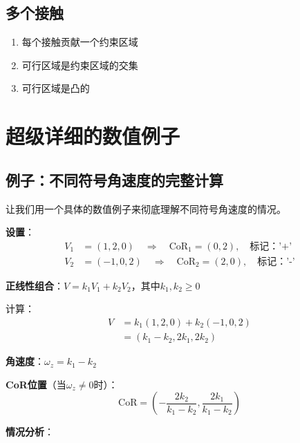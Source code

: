 \documentclass[12pt,a4paper]{article}
\begin{document}
\subsection{多个接触}

\begin{enumerate}
\item 每个接触贡献一个约束区域
\item 可行区域是约束区域的交集
\item 可行区域是凸的
\end{enumerate}

\section{超级详细的数值例子}

\subsection{例子：不同符号角速度的完整计算}

让我们用一个具体的数值例子来彻底理解不同符号角速度的情况。

\textbf{设置}：
\begin{align}
V_1 &= (1, 2, 0) \quad \Rightarrow \quad \text{CoR}_1 = (0, 2), \quad \text{标记：'+'} \\
V_2 &= (-1, 0, 2) \quad \Rightarrow \quad \text{CoR}_2 = (2, 0), \quad \text{标记：'-'}
\end{align}

\textbf{正线性组合}：$V = k_1 V_1 + k_2 V_2$，其中$k_1, k_2 \geq 0$

计算：
\begin{align}
V &= k_1(1, 2, 0) + k_2(-1, 0, 2) \\
&= (k_1 - k_2, 2k_1, 2k_2)
\end{align}

\textbf{角速度}：$\omega_z = k_1 - k_2$

\textbf{CoR位置}（当$\omega_z \neq 0$时）：
\begin{equation}
\text{CoR} = \left(-\frac{2k_2}{k_1 - k_2}, \frac{2k_1}{k_1 - k_2}\right)
\end{equation}

\textbf{情况分析}：
\end{document}
